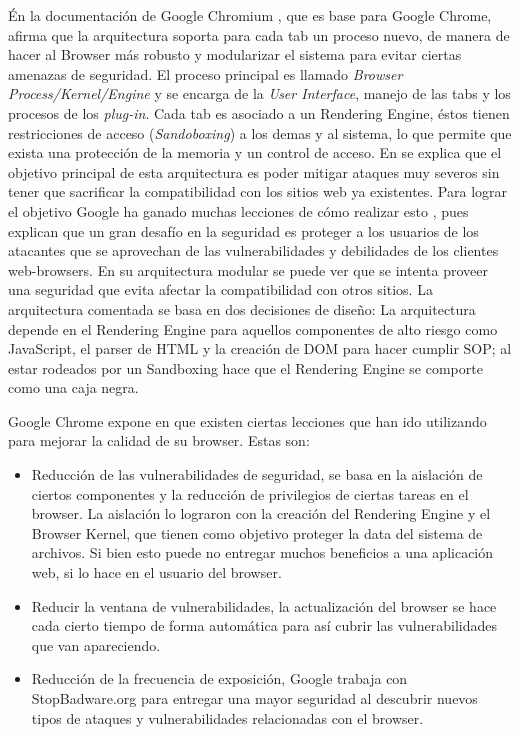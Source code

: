 Én la documentación de Google Chromium \cite{multiProcArchG}, que es base para Google Chrome, afirma que la arquitectura soporta para cada tab un proceso nuevo, de manera de hacer al Browser más robusto y modularizar el sistema para evitar ciertas amenazas de seguridad. El proceso principal es llamado \textit{Browser Process/Kernel/Engine} y se encarga de la \textit{User Interface}, manejo de las tabs y los procesos de los \textit{plug-in}. Cada tab es asociado a un Rendering Engine, éstos tienen restricciones de acceso (\textit{Sandoboxing}) a los demas y al sistema, lo que permite que exista una protección de la memoria y un control de acceso. En \cite{barth2008security} se explica que el objetivo principal de esta arquitectura es poder mitigar ataques muy severos sin tener que sacrificar la compatibilidad con los sitios web ya existentes. Para lograr el objetivo Google ha ganado muchas lecciones de cómo realizar esto \cite{reis2009browser}, pues explican que un gran desafío en la seguridad es proteger a los usuarios de los atacantes que se aprovechan de las vulnerabilidades y debilidades de los clientes web-browsers. En su arquitectura modular se puede ver que se intenta proveer una seguridad que evita afectar la compatibilidad con otros sitios. La arquitectura comentada se basa en dos decisiones de diseño: La arquitectura depende en el Rendering Engine para aquellos componentes de alto riesgo como JavaScript, el parser de HTML y la creación de DOM para hacer cumplir SOP; al estar rodeados por un Sandboxing hace que el Rendering Engine se comporte como una caja negra. 


Google Chrome expone en \cite{reis2009browser} que existen ciertas lecciones que han ido utilizando para mejorar la calidad de su browser. Estas son:

\begin{itemize}
	\item Reducción de las vulnerabilidades de seguridad, se basa en la aislación de ciertos componentes y la reducción de privilegios de ciertas tareas en el browser. La aislación lo lograron con la creación del Rendering Engine y el Browser Kernel, que tienen como objetivo proteger la data del sistema de archivos. Si bien esto puede no entregar muchos beneficios a una aplicación web, si lo hace en el usuario del browser.
	\item Reducir la ventana de vulnerabilidades, la actualización del browser se hace cada cierto tiempo de forma automática para así cubrir las vulnerabilidades que van apareciendo.
	\item Reducción de la frecuencia de exposición, Google trabaja con StopBadware.org para entregar una mayor seguridad al descubrir nuevos tipos de ataques y vulnerabilidades relacionadas con el browser.
\end{itemize}


